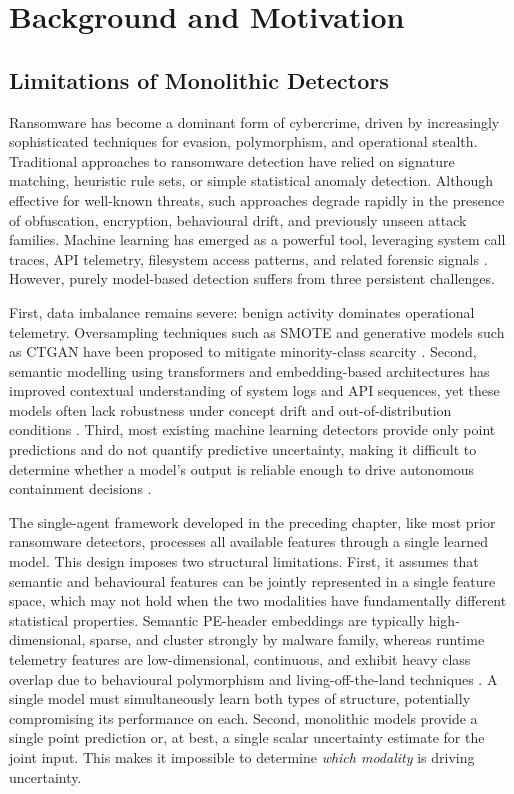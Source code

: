 \section{Background and Motivation}
\label{sec:eswa_background}

\subsection{Limitations of Monolithic Detectors}

Ransomware has become a dominant form of cybercrime, driven by increasingly sophisticated techniques for evasion, polymorphism, and operational stealth. Traditional approaches to ransomware detection have relied on signature matching, heuristic rule sets, or simple statistical anomaly detection. Although effective for well-known threats, such approaches degrade rapidly in the presence of obfuscation, encryption, behavioural drift, and previously unseen attack families. Machine learning has emerged as a powerful tool, leveraging system call traces, API telemetry, filesystem access patterns, and related forensic signals \cite{zahoora2022Deep, alraizza2023ransomware}. However, purely model-based detection suffers from three persistent challenges.

First, data imbalance remains severe: benign activity dominates operational telemetry. Oversampling techniques such as SMOTE and generative models such as CTGAN have been proposed to mitigate minority-class scarcity \cite{chawla2002smote, xu2019ctgan}. Second, semantic modelling using transformers and embedding-based architectures has improved contextual understanding of system logs and API sequences, yet these models often lack robustness under concept drift and out-of-distribution conditions \cite{fernando2020study}. Third, most existing machine learning detectors provide only point predictions and do not quantify predictive uncertainty, making it difficult to determine whether a model's output is reliable enough to drive autonomous containment decisions \cite{gal2016dropout, gawlikowski2023Uncertainity}.

The single-agent framework developed in the preceding chapter, like most prior ransomware detectors, processes all available features through a single learned model. This design imposes two structural limitations. First, it assumes that semantic and behavioural features can be jointly represented in a single feature space, which may not hold when the two modalities have fundamentally different statistical properties. Semantic PE-header embeddings are typically high-dimensional, sparse, and cluster strongly by malware family, whereas runtime telemetry features are low-dimensional, continuous, and exhibit heavy class overlap due to behavioural polymorphism and living-off-the-land techniques \cite{Ceschin2022ConceptDrift}. A single model must simultaneously learn both types of structure, potentially compromising its performance on each. Second, monolithic models provide a single point prediction or, at best, a single scalar uncertainty estimate for the joint input. This makes it impossible to determine \emph{which modality} is driving uncertainty.


